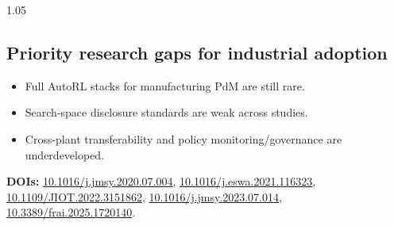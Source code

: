 \documentclass[11pt]{article}
\begin{document}
\begin{spacing}{1.05}
\subsection*{Priority research gaps for industrial adoption}
\begin{itemize}
    \item Full AutoRL stacks for manufacturing PdM are still rare.
    \item Search-space disclosure standards are weak across studies.
    \item Cross-plant transferability and policy monitoring/governance are underdeveloped.
\end{itemize}

\textbf{DOIs:} \href{https://doi.org/10.1016/j.jmsy.2020.07.004}{10.1016/j.jmsy.2020.07.004},
\href{https://doi.org/10.1016/j.eswa.2021.116323}{10.1016/j.eswa.2021.116323},
\href{https://doi.org/10.1109/JIOT.2022.3151862}{10.1109/JIOT.2022.3151862},
\href{https://doi.org/10.1016/j.jmsy.2023.07.014}{10.1016/j.jmsy.2023.07.014},
\href{https://doi.org/10.3389/frai.2025.1720140}{10.3389/frai.2025.1720140}.

\end{spacing}
\end{document}
